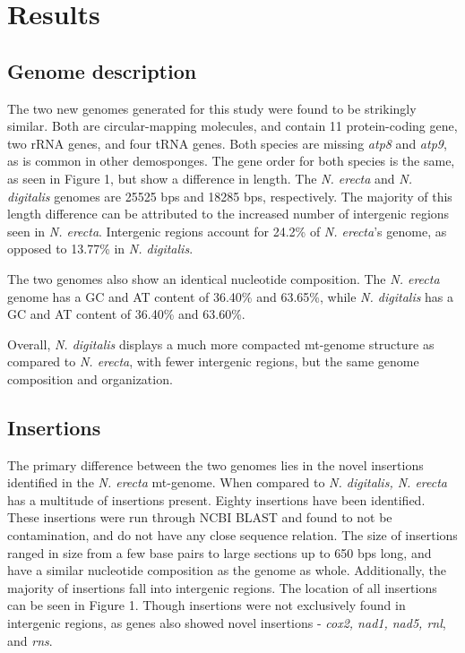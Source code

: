 \documentclass[../main.tex]{subfiles}
\begin{document}
\section{Results}

\subsection{Genome description}
The two new genomes generated for this study were found to be strikingly similar. Both are circular-mapping molecules, and contain 11 protein-coding gene, two rRNA genes, and four tRNA genes. Both species are missing \emph{atp8} and \emph{atp9}, as is common in other demosponges. The gene order for both species is the same, as seen in Figure 1, but show a difference in length. The \emph{N. erecta} and \emph{N. digitalis} genomes are 25525 bps and 18285 bps, respectively. The majority of this length difference can be attributed to the increased number of intergenic regions seen in \emph{N. erecta}. Intergenic regions account for 24.2\% of \emph{N. erecta}'s genome, as opposed to 13.77\% in \emph{N. digitalis}. 

The two genomes also show an identical nucleotide composition. The \emph{N. erecta} genome has a GC and AT content of 36.40\% and 63.65\%, while \emph{N. digitalis} has a GC and AT content of 36.40\% and 63.60\%. 

Overall, \emph{N. digitalis} displays a much more compacted mt-genome structure as compared to \emph{N. erecta}, with fewer intergenic regions, but the same genome composition and organization.

\subsection{Insertions}
The primary difference between the two genomes lies in the novel insertions identified in the \emph{N. erecta} mt-genome. When compared to \emph{N. digitalis, N. erecta} has a multitude of insertions present. Eighty insertions have been identified. These insertions were run through NCBI BLAST and found to not be contamination, and do not have any close sequence relation. The size of insertions ranged in size from a few base pairs to large sections up to 650 bps long, and have a similar nucleotide composition as the genome as whole. Additionally, the majority of insertions fall into intergenic regions. The location of all insertions can be seen in Figure 1. Though insertions were not exclusively found in intergenic regions, as genes also showed novel insertions - \emph{cox2, nad1, nad5, rnl}, and \emph{rns}. 
\end{document}
